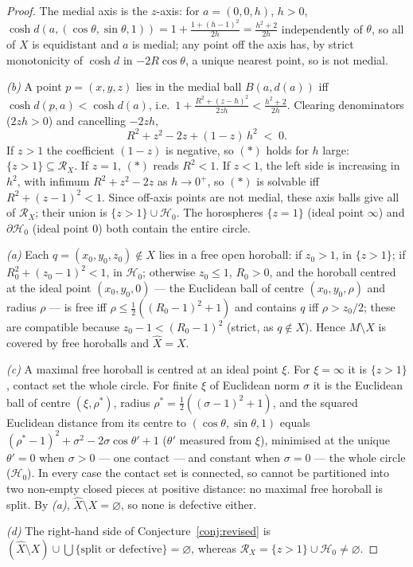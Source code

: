 \documentclass[11pt]{article}
\theoremstyle{remark}
\newcommand{\X}{X}
\newcommand{\Xhat}{\widehat{\X}}
\newcommand{\Rx}{\mathcal{R}_{\X}}
\newcommand{\B}{B}
\begin{document}
\begin{proof}
The medial axis is the $z$-axis: for $a=(0,0,h)$, $h>0$,
$\cosh d(a,(\cos\theta,\sin\theta,1))=1+\frac{1+(h-1)^{2}}{2h}=
\frac{h^{2}+2}{2h}$ independently of $\theta$, so all of $\X$ is
equidistant and $a$ is medial; any point off the axis has, by strict
monotonicity of $\cosh d$ in $-2R\cos\theta$, a unique nearest point,
so is not medial.

\emph{(b)} A point $p=(x,y,z)$ lies in the medial ball
$\B(a,d(a))$ iff $\cosh d(p,a)<\cosh d(a)$, i.e.\
$1+\frac{R^{2}+(z-h)^{2}}{2zh}<\frac{h^{2}+2}{2h}$. Clearing
denominators ($2zh>0$) and cancelling $-2zh$,
\[
R^{2}+z^{2}-2z+(1-z)\,h^{2}\;<\;0 .\tag{$\ast$}
\]
If $z>1$ the coefficient $(1-z)$ is negative, so $(\ast)$ holds for
$h$ large: $\{z>1\}\subseteq\Rx$. If $z=1$, $(\ast)$ reads $R^{2}<1$.
If $z<1$, the left side is increasing in $h^{2}$, with infimum
$R^{2}+z^{2}-2z$ as $h\to0^{+}$, so $(\ast)$ is solvable iff
$R^{2}+(z-1)^{2}<1$. Since off-axis points are not medial, these
axis balls give all of $\Rx$; their union is
$\{z>1\}\cup\mathcal{H}_{0}$. The horospheres $\{z=1\}$ (ideal point
$\infty$) and $\partial\mathcal{H}_{0}$ (ideal point $0$) both contain
the entire circle.

\emph{(a)} Each $q=(x_{0},y_{0},z_{0})\notin\X$ lies in a free open
horoball: if $z_{0}>1$, in $\{z>1\}$; if $R_{0}^{2}+(z_{0}-1)^{2}<1$,
in $\mathcal{H}_{0}$; otherwise $z_{0}\le1$, $R_{0}>0$, and the
horoball centred at the ideal point $(x_{0},y_{0},0)$ --- the
Euclidean ball of centre $(x_{0},y_{0},\rho)$ and radius $\rho$ ---
is free iff $\rho\le\tfrac12((R_{0}-1)^{2}+1)$ and contains $q$ iff
$\rho>z_{0}/2$; these are compatible because
$z_{0}-1<(R_{0}-1)^{2}$ (strict, as $q\notin\X$). Hence
$M\setminus\X$ is covered by free horoballs and $\Xhat=\X$.

\emph{(c)} A maximal free horoball is centred at an ideal point
$\xi$. For $\xi=\infty$ it is $\{z>1\}$, contact set the whole
circle. For finite $\xi$ of Euclidean norm $\sigma$ it is the
Euclidean ball of centre $(\xi,\rho^{\ast})$, radius
$\rho^{\ast}=\tfrac12((\sigma-1)^{2}+1)$, and the squared Euclidean
distance from its centre to $(\cos\theta,\sin\theta,1)$ equals
$(\rho^{\ast}-1)^{2}+\sigma^{2}-2\sigma\cos\theta'+1$ ($\theta'$
measured from $\xi$), minimised at the unique $\theta'=0$ when
$\sigma>0$ --- one contact --- and constant when $\sigma=0$ --- the
whole circle ($\mathcal{H}_{0}$). In every case the contact set is
connected, so cannot be partitioned into two non-empty closed pieces
at positive distance: no maximal free horoball is split. By \emph{(a)},
$\Xhat\setminus\X=\varnothing$, so none is defective either.

\emph{(d)} The right-hand side of Conjecture~\ref{conj:revised} is
$(\Xhat\setminus\X)\cup\bigcup\{\text{split or defective}\}=
\varnothing$, whereas $\Rx=\{z>1\}\cup\mathcal{H}_{0}\neq\varnothing$.
\end{proof}
\end{document}

